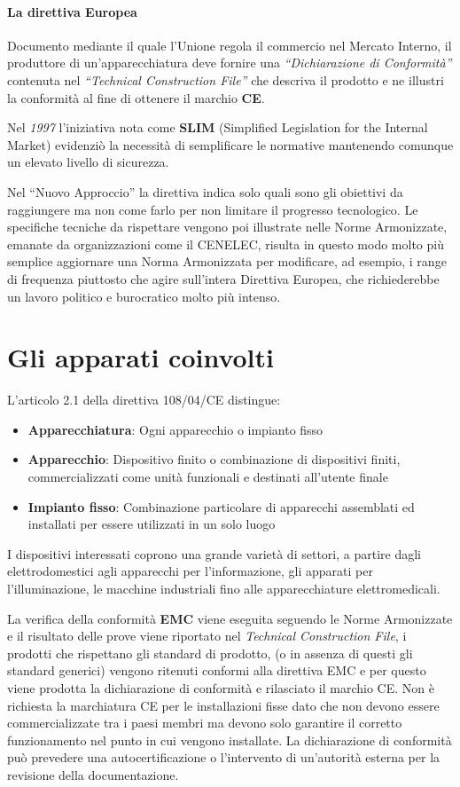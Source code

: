 \paragraph{La direttiva Europea}
Documento mediante il quale l'Unione regola il commercio nel Mercato Interno, il produttore di un'apparecchiatura
deve fornire una \textit{``Dichiarazione di Conformità''} contenuta nel \textit{``Technical Construction
File''} che descriva il prodotto e ne illustri la conformità al fine di ottenere il marchio \textbf{CE}.

Nel \textit{1997} l'iniziativa nota come \textbf{SLIM} (Simplified Legislation for the Internal Market)
evidenziò la necessità di semplificare le normative mantenendo comunque un elevato livello di sicurezza.

Nel ``Nuovo Approccio'' la direttiva indica solo quali sono gli obiettivi da raggiungere ma non come farlo
per non limitare il progresso tecnologico. Le specifiche tecniche da rispettare vengono poi illustrate
nelle Norme Armonizzate, emanate da organizzazioni come il CENELEC, risulta in questo modo molto più semplice
aggiornare una Norma Armonizzata per modificare, ad esempio, i range di frequenza piuttosto che agire sull'intera 
Direttiva Europea, che richiederebbe un lavoro politico e burocratico molto più intenso.

\section{Gli apparati coinvolti}
L'articolo 2.1 della direttiva 108/04/CE distingue:
\begin{itemize}
 \item \textbf{Apparecchiatura}: Ogni apparecchio o impianto fisso
 \item \textbf{Apparecchio}: Dispositivo finito o combinazione di dispositivi finiti, commercializzati come unità 
 funzionali e destinati all'utente finale
 \item \textbf{Impianto fisso}: Combinazione particolare di apparecchi assemblati ed installati per essere
 utilizzati in un solo luogo
\end{itemize}

I dispositivi interessati coprono una grande varietà di settori, a partire dagli elettrodomestici agli apparecchi
per l'informazione, gli apparati per l'illuminazione, le macchine industriali fino alle apparecchiature 
elettromedicali.

La verifica della conformità \textbf{EMC} viene eseguita seguendo le Norme Armonizzate e il risultato delle prove viene
riportato nel \textit{Technical Construction File}, i prodotti che rispettano gli standard di prodotto, (o in assenza
di questi gli standard generici) vengono ritenuti conformi alla direttiva EMC e per questo viene prodotta la
dichiarazione di conformità e rilasciato il marchio CE.
Non è richiesta la marchiatura CE per le installazioni fisse dato che non devono essere commercializzate
tra i paesi membri ma devono solo garantire il corretto funzionamento nel punto in cui vengono installate.
La dichiarazione di conformità può prevedere una autocertificazione o l'intervento di un'autorità esterna per la
revisione della documentazione.


